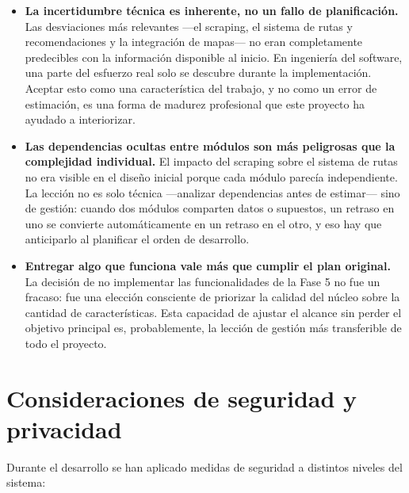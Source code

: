 \begin{itemize}
    \item \textbf{La incertidumbre técnica es inherente, no un fallo de planificación.} Las desviaciones más relevantes ---el scraping, el sistema de rutas y recomendaciones y la integración de mapas--- no eran completamente predecibles con la información disponible al inicio. En ingeniería del software, una parte del esfuerzo real solo se descubre durante la implementación. Aceptar esto como una característica del trabajo, y no como un error de estimación, es una forma de madurez profesional que este proyecto ha ayudado a interiorizar.

    \item \textbf{Las dependencias ocultas entre módulos son más peligrosas que la complejidad individual.} El impacto del scraping sobre el sistema de rutas no era visible en el diseño inicial porque cada módulo parecía independiente. La lección no es solo técnica ---analizar dependencias antes de estimar--- sino de gestión: cuando dos módulos comparten datos o supuestos, un retraso en uno se convierte automáticamente en un retraso en el otro, y eso hay que anticiparlo al planificar el orden de desarrollo.

    \item \textbf{Entregar algo que funciona vale más que cumplir el plan original.} La decisión de no implementar las funcionalidades de la Fase 5 no fue un fracaso: fue una elección consciente de priorizar la calidad del núcleo sobre la cantidad de características. Esta capacidad de ajustar el alcance sin perder el objetivo principal es, probablemente, la lección de gestión más transferible de todo el proyecto.
\end{itemize}

\section{Consideraciones de seguridad y privacidad}

Durante el desarrollo se han aplicado medidas de seguridad a distintos niveles del sistema:

